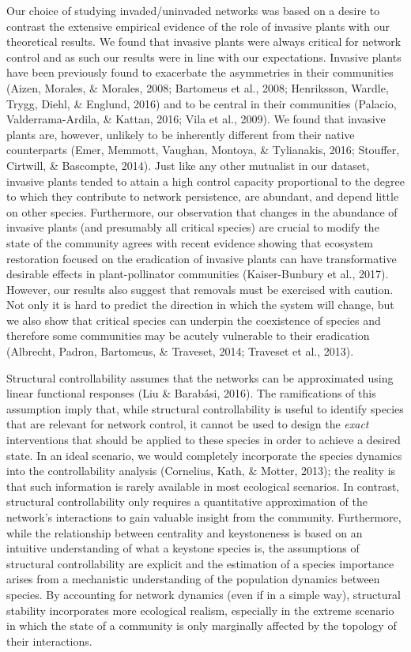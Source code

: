 \documentclass[a4paper]{artikel1}
\newcommand{\R}[1]{\label{#1}\linelabel{#1}}
\theoremstyle{definition}
\theoremstyle{definition}
\theoremstyle{definition}
\theoremstyle{remark}
\begin{document}
Our choice of studying invaded/uninvaded networks was based on a desire
to contrast the extensive empirical evidence of the role of invasive
plants with our theoretical results. We found that invasive plants were
always critical for network control and as such our results were in line
with our expectations. Invasive plants have been previously found to
exacerbate the asymmetries in their communities (Aizen, Morales, \&
Morales, 2008; Bartomeus et al., 2008; Henriksson, Wardle, Trygg, Diehl,
\& Englund, 2016) and to be central in their communities (Palacio,
Valderrama-Ardila, \& Kattan, 2016; Vila et al., 2009). We found that
invasive plants are, however, unlikely to be inherently different from
their native counterparts (Emer, Memmott, Vaughan, Montoya, \&
Tylianakis, 2016; Stouffer, Cirtwill, \& Bascompte, 2014). Just like any
other mutualist in our dataset, invasive plants tended to attain a high
control capacity proportional to the degree to which they contribute to
network persistence, are abundant, and depend little on other species.
Furthermore, our observation that changes in the abundance of invasive
plants (and presumably all critical species) are crucial to modify the
state of the community agrees with recent evidence showing that
ecosystem restoration focused on the eradication of invasive plants can
have transformative desirable effects in plant-pollinator
communities\R{extra-references-3} (Kaiser-Bunbury et al., 2017).
However, our results also suggest that removals must be exercised with
caution. Not only it is hard to predict the direction in which the
system will change, but we also show that critical species can underpin
the coexistence of species and therefore some communities may be acutely
vulnerable to their eradication (Albrecht, Padron, Bartomeus, \&
Traveset, 2014; Traveset et al., 2013).

Structural controllability assumes that the networks can be approximated
using linear functional responses (Liu \& Barabási, 2016). The
ramifications of this assumption imply that, while structural
controllability is useful to identify species that are relevant for
network control, it cannot be used to design the \emph{exact}
interventions that should be applied to these species in order to
achieve a desired state. In an ideal scenario, we would completely
incorporate the species dynamics into the controllability analysis
(Cornelius, Kath, \& Motter, 2013); the reality is that such information
is rarely available in most ecological scenarios.
\R{data-requirements}In contrast, structural controllability only
requires a quantitative approximation of the network's interactions to
gain valuable insight from the community. Furthermore, while the
relationship between centrality and keystoneness is based on an
intuitive understanding of what a keystone species is, the assumptions
of structural controllability are explicit and the estimation of a
species importance arises from a mechanistic understanding of the
population dynamics between species. By accounting for network dynamics
(even if in a simple way), structural stability incorporates more
ecological realism, especially in the extreme scenario in which the
state of a community is only marginally affected by the topology of
their interactions.
\end{document}
